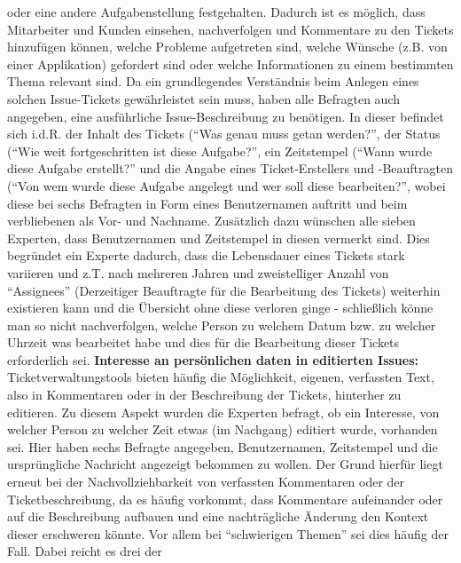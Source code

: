 oder eine andere Aufgabenstellung festgehalten. \newline Dadurch ist es möglich, dass Mitarbeiter und Kunden einsehen, nachverfolgen und Kommentare zu den Tickets hinzufügen können, welche Probleme aufgetreten sind, welche Wünsche (z.B. von einer Applikation) gefordert sind oder welche Informationen zu einem bestimmten Thema relevant sind. Da ein grundlegendes Verständnis beim
Anlegen eines solchen Issue-Tickets gewährleistet sein muss, haben alle Befragten auch angegeben, eine ausführliche Issue-Beschreibung zu benötigen. In dieser befindet sich i.d.R. der Inhalt des Tickets (\enquote{Was genau muss getan werden?}, der Status (\enquote{Wie weit fortgeschritten ist diese Aufgabe?}, ein Zeitstempel (\enquote{Wann wurde diese Aufgabe erstellt?} 
und die Angabe eines Ticket-Erstellers und -Beauftragten (\enquote{Von wem wurde diese Aufgabe angelegt und wer soll diese bearbeiten?}, wobei diese bei sechs Befragten in Form eines Benutzernamen auftritt und beim verbliebenen als Vor- und Nachname. \newline Zusätzlich dazu wünschen alle sieben Experten, dass Benutzernamen und Zeitstempel in diesen vermerkt sind. Dies begründet ein 
Experte dadurch, dass die Lebensdauer eines Tickets stark variieren und z.T. nach mehreren Jahren und zweistelliger Anzahl von \enquote{Assignees} (Derzeitiger Beauftragte für die Bearbeitung des Tickets) weiterhin existieren kann und die Übersicht ohne diese verloren ginge - schließlich könne man so nicht nachverfolgen, welche Person zu welchem Datum bzw. zu welcher Uhrzeit 
was bearbeitet habe und dies für die Bearbeitung dieser Tickets erforderlich sei. \newline \newline
\textbf{Interesse an persönlichen daten in editierten Issues:} \newline \label{comments}
Ticketverwaltungstools bieten häufig die Möglichkeit, eigenen, verfassten Text, also in Kommentaren oder in der Beschreibung der Tickets, hinterher zu editieren. Zu diesem Aspekt wurden die Experten befragt, ob ein Interesse, von welcher Person zu welcher Zeit etwas (im Nachgang) editiert wurde, vorhanden sei. \newline Hier haben sechs Befragte angegeben, Benutzernamen, Zeitstempel und die ursprüngliche Nachricht
angezeigt bekommen zu wollen. Der Grund hierfür liegt erneut bei der Nachvollziehbarkeit von verfassten Kommentaren oder der Ticketbeschreibung, da es häufig vorkommt, dass Kommentare aufeinander oder auf die Beschreibung aufbauen und eine nachträgliche Änderung den Kontext dieser erschweren könnte. Vor allem bei \enquote{schwierigen Themen} sei dies häufig der Fall. Dabei reicht es drei der
